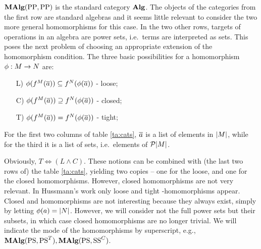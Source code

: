 $\mbox{\rm\bf MAlg}({\rm PP},{\rm PP})$ is the standard category $\mbox{\rm\bf Alg}$. The objects of the
categories from the first row are standard algebras and it seems
little relevant to consider the two more general homomorphisms for
this case. In the two other rows, targets of operations in an algebra
are power sets, i.e.\ terms are interpreted as sets. This poses the
next problem of choosing an appropriate extension of the homomorphism
condition. The three basic possibilities for a homomorphism
$\phi:M\rightarrow N$ are:
\begin{itemize}
\item[L)]  $\phi(f^M(\overline {a})) \subseteq f^N(\phi(\overline {a}))$ - loose;
\item[C)]  $\phi(f^M(\overline {a})) \supseteq f^N(\phi(\overline {a}))$ - closed;
\item[T)]  $\phi(f^M(\overline {a})) = f^N(\phi(\overline {a}))$ - tight;
\end{itemize}
For the first two columns of table \ref{ta:cats}, $\overline {a}$ is a list
of elements in $|M|$, while for the third it is a list of sets,
i.e.\ elements of ${\cal P}{|M|}$.

Obviously, $T\iff (L\land C)$. These notions can be combined with (the
last two rows of) the table \ref{ta:cats}, yielding two copies -- one
for the loose, and one for the closed homomorphisms.  However, closed
homomorphisms are not very relevant.  In Hussmann's work only loose
and tight \PS-homomorphisms appear.  Closed {\SSs} and {\PS}
homo\-mor\-phisms are not interesting because they always exist,
simply by letting $\phi(a) = |N|$. However, we will consider not
the full power sets but their subsets, in which case closed
homomorphisms are no longer trivial.
We will indicate the mode of the homomorphisms by superscript, e.g., $\mbox{\rm\bf MAlg}({\rm PS},{\rm PS}^T),
\mbox{\rm\bf MAlg}({\rm PS},{\rm SS}^C)$.

%

